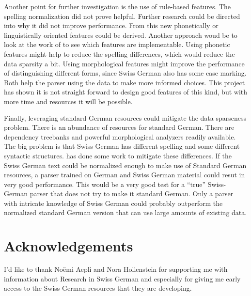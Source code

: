 \documentclass[11pt,letterpaper, covington]{article}
\begin{document}
Another point for further investigation is the use of rule-based features. The spelling normalization did not prove helpful. Further research could be directed into why it did not improve performance. From this new phonetically or linguistically oriented features could be derived. Another approach woud be to look at the work of \citet{SR10} to see which features are implementable. Using phonetic features might help to reduce the spelling differences, which would reduce the data sparsity a bit. Using morphological features might improve the performance of distinguishing different forms, since Swiss German also has some case marking. Both help the parser using the data to make more informed choices. This project has shown it is not straight forward to design good features of this kind, but with more time and resources it will be possible.

Finally, leveraging standard German resources could mitigate the data sparseness problem. There is an abundance of resources for standard German. There are dependency treebanks and powerful morphological analyzers readily available. The big problem is that Swiss German has different spelling and some different syntactic structures. \citet{Scherrer11} has done some work to mitigate these differences. If the Swiss German text could be normalized enough to make use of Standard German resources, a parser trained on German and Swiss German material could resut in very good performance. This would be a very good test for a ``true'' Swiss-German parser that does not try to make it standard German. Only a parser with intricate knowledge of Swiss German could probably outperform the normalized standard German version that can use large amounts of existing data. 

\section{Acknowledgements}
I'd like to thank Noëmi Aepli and Nora Hollenstein for supporting me with information about Research in Swiss German and especially for giving me early access to the Swiss German resources that they are developing. 



\label{lastpage}
\end{document}
